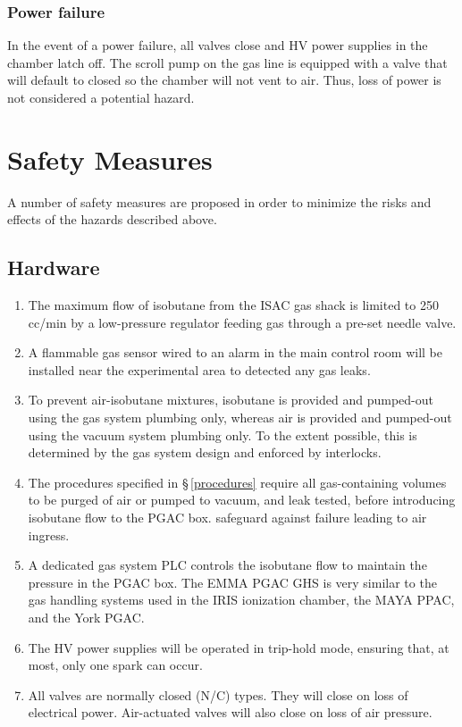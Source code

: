 \subsubsection{Power failure} In the event of a power failure, all valves close and HV power supplies in the chamber latch off. The
scroll pump on the gas line is equipped with a valve that will default to closed so the chamber will
not vent to air. Thus, loss of power is not considered a potential hazard.

\section{Safety Measures}
A number of safety measures are proposed in order to minimize the risks and effects of the hazards
described above.
\subsection{Hardware}
\begin{enumerate}
\setlength{\itemsep}{0pt}
\setlength{\parskip}{0pt}
\setlength{\parsep}{0pt}

\item The maximum flow of isobutane from the ISAC gas shack is limited to 250\,cc/min by a low-pressure regulator feeding gas through a pre-set needle valve.
\item A flammable gas sensor wired to an alarm in the main control room will be installed near the experimental area to detected any gas
leaks.
\item To prevent air-isobutane mixtures, isobutane is provided and pumped-out using the gas system plumbing only, whereas air is provided and pumped-out using the vacuum system plumbing only. To the extent possible, this is determined by the gas system design and enforced by interlocks.
\item The procedures specified in \S\,\ref{procedures} require all gas-containing volumes to be purged of air or pumped to vacuum, and leak tested, before introducing isobutane flow to the PGAC box.
safeguard against failure leading to air ingress.
\item A dedicated gas system PLC controls the isobutane flow to maintain the pressure in the PGAC box. The EMMA PGAC GHS is very similar to the gas handling systems used in the IRIS ionization chamber, the MAYA PPAC, and the York PGAC.
\item The HV power supplies will be operated in trip-hold mode, ensuring that, at most, only one spark can occur.
\item All valves are normally closed (N/C) types. They will close on loss of electrical power. Air-actuated valves will also close on loss of air pressure.

\end{enumerate}
